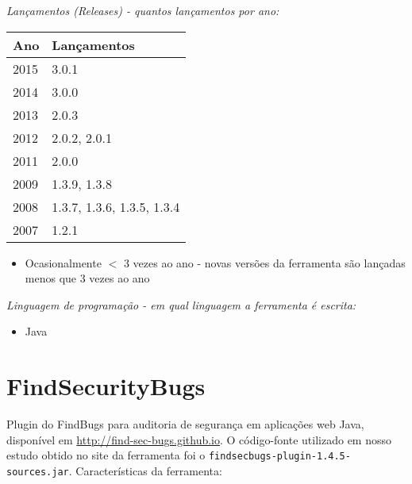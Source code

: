 \begin{description}

  \item {\it Lançamentos ({\it Releases}) - quantos lançamentos por ano:}
    \begin{table}[h!]
      \centering
      \begin{tabular}{| l | l |}
        \hline
        Ano  & Lançamentos                \\
        \hline
        2015 & 3.0.1                      \\
        2014 & 3.0.0                      \\
        2013 & 2.0.3                      \\
        2012 & 2.0.2, 2.0.1               \\
        2011 & 2.0.0                      \\
        2009 & 1.3.9, 1.3.8               \\
        2008 & 1.3.7, 1.3.6, 1.3.5, 1.3.4 \\
        2007 & 1.2.1                      \\
        \hline
      \end{tabular}
    \end{table}
    \begin{itemize}
      \item Ocasionalmente $<$ 3 vezes ao ano - novas versões da ferramenta são lançadas menos que 3 vezes ao ano
    \end{itemize}

  \item {\it Linguagem de programação - em qual linguagem a ferramenta é escrita:}
    \begin{itemize}
      \item Java
    \end{itemize}

\end{description}

\section{FindSecurityBugs}

Plugin do FindBugs para auditoria de segurança em aplicações web Java,
disponível em \url{http://find-sec-bugs.github.io}.  O código-fonte utilizado
em nosso estudo obtido no site da ferramenta foi o
\texttt{findsecbugs-plugin-1.4.5-sources.jar}. Características da ferramenta:

